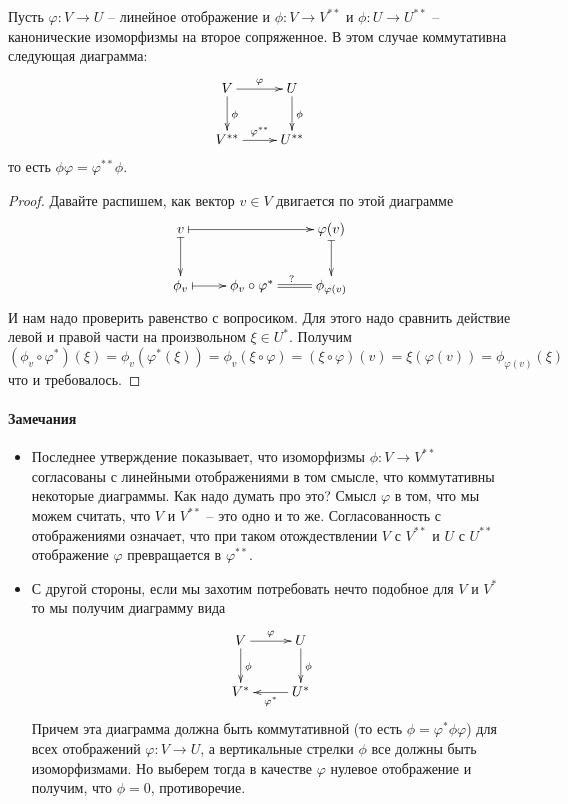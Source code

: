\begin{claim}
\label{claim::CanonicalIsomorphism}
Пусть $\varphi\colon V\to U$ -- линейное отображение и $\phi\colon V\to V^{**}$ и $\phi\colon U\to U^{**}$ -- канонические изоморфизмы на второе сопряженное.
В этом случае коммутативна следующая диаграмма:
\[
\xymatrix{
	{V}\ar[r]^{\varphi}\ar[d]^{\phi}&{U}\ar[d]^{\phi}\\
	{V^{**}}\ar[r]^{\varphi^{**}}&{U^{**}}
}
\]
то есть $\phi \varphi = \varphi^{**}\phi$.
\end{claim}
\begin{proof}
Давайте распишем, как вектор $v\in V$ двигается по этой диаграмме
\[
\xymatrix{
	{v}\ar@{|->}[rr]\ar@{|->}[d]&{}&{\varphi(v)}\ar@{|->}[d]\\
	{\phi_v}\ar@{|->}[r]&{\phi_v\circ \varphi^*}\ar@{=}[r]^{?}&{\phi_{\varphi(v)}}
}
\]
И нам надо проверить равенство с вопросиком.
Для этого надо сравнить действие левой и правой части на произвольном $\xi\in U^*$.
Получим
\[
(\phi_v\circ \varphi^*)(\xi) = \phi_v(\varphi^*(\xi)) = \phi_v(\xi\circ\varphi) = (\xi\circ \varphi) (v) = \xi(\varphi(v)) = \phi_{\varphi(v)}(\xi)
\]
что и требовалось.
\end{proof}

\paragraph{Замечания}

\begin{itemize}
\item Последнее утверждение показывает, что изоморфизмы $\phi\colon V\to V^{**}$ согласованы с линейными отображениями в том смысле, что коммутативны некоторые диаграммы.
Как надо думать про это?
Смысл $\varphi$ в том, что мы можем считать, что $V$ и $V^{**}$ -- это одно и то же.
Согласованность с отображениями означает, что при таком отождествлении $V$ с $V^{**}$ и $U$ с $U^{**}$ отображение $\varphi$ превращается в $\varphi^{**}$.

\item С другой стороны, если мы захотим потребовать нечто подобное для $V$ и $V^*$ то мы получим диаграмму вида
\[
\xymatrix{
	{V}\ar[r]^{\varphi}\ar[d]^{\phi}&{U}\ar[d]^{\phi}\\
	{V^*}&{U^*}\ar[l]^{\varphi^*}
}
\]
Причем эта диаграмма должна быть коммутативной (то есть $\phi = \varphi^*\phi\varphi$) для всех отображений $\varphi\colon V\to U$, а вертикальные стрелки $\phi$ все должны быть изоморфизмами.
Но выберем тогда в качестве $\varphi$ нулевое отображение и получим, что $\phi = 0$, противоречие.
\end{itemize}



